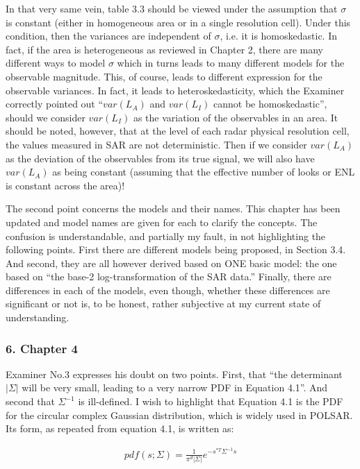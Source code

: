 In that very same vein, table 3.3 should be viewed under the assumption that $\sigma$ is constant (either in homogeneous area or in a single resolution cell).
Under this condition, then the variances are independent of $\sigma$, i.e. it is homoskedastic.
In fact, if the area is heterogeneous as reviewed in Chapter 2, there are many different ways to model $\sigma$ which in turns leads to many different models for the observable magnitude.
This, of course, leads to different expression for the observable variances.
In fact, it leads to heteroskedasticity, which the Examiner correctly pointed out ``$var(L_A)$ and $var(L_I)$ cannot be homoskedastic'', should we consider $var(L_I)$ as the variation of the observables in an area.
It should be noted, however, that at the level of each radar physical resolution cell, the values measured in SAR are not deterministic.
Then if we consider $var(L_A)$ as the deviation of the observables from its true signal, we will also have $var(L_A)$ as being constant (assuming that the effective number of looks or ENL is constant across the area)!

The second point concerns the models and their names.
This chapter has been updated and model names are given for each to clarify the concepts.
The confusion is understandable, and partially my fault, in not highlighting the following points.
First there are different models being proposed, in Section 3.4.
And second, they are all however derived based on ONE basic model: the one based on ``the base-2 log-transformation of the SAR data.''
Finally, there are differences in each of the models, even though, whether these differences are significant or not is, to be honest, rather subjective at my current state of understanding.

\subsubsection*{6. Chapter 4}

Examiner No.3 expresses his doubt on two points.
First, that ``the determinant $|\Sigma|$ will be very small, leading to a very narrow PDF in Equation 4.1''.
And second that $\Sigma^{-1}$ is ill-defined.
I wish to highlight that Equation 4.1 is the PDF for the circular complex Gaussian distribution, which is widely used in POLSAR.
Its form, as repeated from equation 4.1, is written as:

\begin{align*}
  pdf(s;\Sigma)=\frac{1}{\pi^d |\Sigma|} e^{-s^{*T}\Sigma^{-1}s}
\end{align*}  

